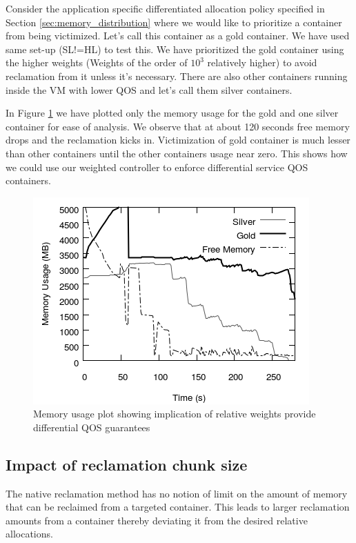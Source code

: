       Consider the application specific differentiated allocation policy specified in Section 
\ref{sec:memory_distribution} where we would like to prioritize a container from being 
victimized. Let's call this container as a gold container. We have used same set-up 
(SL!=HL) to test this. We have prioritized the gold container using the higher weights 
(Weights of the order of $10^{3}$ relatively higher) to avoid reclamation from it unless it's necessary.
There are also other containers running inside the VM with lower QOS and let's call them silver containers.

In Figure \ref{priority_cont} we have plotted only the memory usage for the gold and one silver container for ease of analysis. We 
observe that at about 120 seconds free memory drops and the reclamation kicks in. Victimization of gold container is much lesser than other 
containers until the other containers usage near zero. This shows how we could use our weighted controller to enforce differential 
service QOS containers.

\begin{figure}
  \centering
  \includegraphics[scale=0.7]{images/mem_sol/gold/memory_usage.png}
  \caption{\footnotesize Memory usage plot showing implication of relative weights provide differential QOS guarantees}
  \label{priority_cont}
\end{figure}
    
    \subsection{Impact of reclamation chunk size}
    
    
    The native reclamation method has no notion of limit on the
amount of memory that can be reclaimed from a targeted container. This leads to larger 
reclamation amounts from a container thereby deviating it from the desired relative 
allocations.

